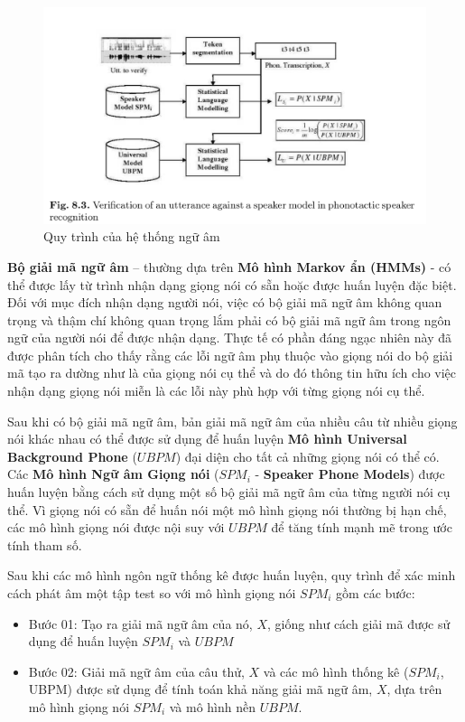\documentclass{article}
\begin{document}
	\begin{figure}[H]
		\centering
		\includegraphics[width=1\linewidth]{images/figure_8_3.png}
		\caption{Quy trình của hệ thống ngữ âm}
		\label{fig:writing-thesis}
	\end{figure}
	
	\textbf{Bộ giải mã ngữ âm} – thường dựa trên \textbf{Mô hình Markov ẩn (HMMs)} - có thể được lấy từ trình nhận dạng giọng nói có sẵn hoặc được huấn luyện đặc biệt. Đối với mục đích nhận dạng người nói, việc có bộ giải mã ngữ âm không quan trọng và thậm chí không quan trọng lắm phải có bộ giải mã ngữ âm trong ngôn ngữ của người nói để được nhận dạng. Thực tế có phần đáng ngạc nhiên này đã được phân tích cho thấy rằng các lỗi ngữ âm phụ thuộc vào giọng nói do bộ giải mã tạo ra dường như là của giọng nói cụ thể và do đó thông tin hữu ích cho việc nhận dạng giọng nói miễn là các lỗi này phù hợp với từng giọng nói cụ thể.
	
	Sau khi có bộ giải mã ngữ âm, bản giải mã ngữ âm của nhiều câu từ nhiều giọng nói khác nhau có thể được sử dụng để huấn luyện \textbf{Mô hình Universal Background Phone} ($UBPM$) đại diện cho tất cả những giọng nói có thể có. Các \textbf{Mô hình Ngữ âm Giọng nói} ($SPM_i$ - \textbf{Speaker Phone Models}) được huấn luyện bằng cách sử dụng một số bộ giải mã ngữ âm của từng người nói cụ thể. Vì giọng nói có sẵn để huấn nói một mô hình giọng nói thường bị hạn chế, các mô hình giọng nói được nội suy với $UBPM$ để tăng tính mạnh mẽ trong ước tính tham số. 
	
	Sau khi các mô hình ngôn ngữ thống kê được huấn luyện, quy trình để xác minh cách phát âm một tập test so với mô hình giọng nói $SPM_i$ gồm các bước:
	\begin{itemize}
		\item Bước 01: Tạo ra giải mã ngữ âm của nó, $X$, giống như cách giải mã được sử dụng để huấn luyện $SPM_{i}$ và $UBPM$
		\item Bước 02: Giải mã ngữ âm của câu thử, $X$ và các mô hình thống kê ($SPM_{i}$, UBPM) được sử dụng để tính toán khả năng giải mã ngữ âm, $X$, dựa trên mô hình giọng nói $SPM_{i}$ và mô hình nền $UBPM$. 
	\end{itemize}
		
\end{document}
